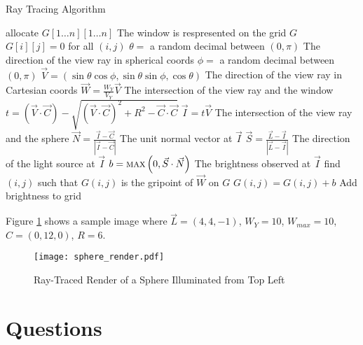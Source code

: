 \documentclass{article}
\begin{document}
\begin{algorithm}
  \caption{Ray Tracing Algorithm}
  \label{Alg}
  \begin{algorithmic}[1]
    \State allocate $G[1\ldots n][1\ldots n]$
      \Comment The window is respresented on the grid $G$
    \State $G[i][j] = 0$ for all $(i,j)$
    \Repeat
      \State $\theta = $ a random decimal between $\left(0, \pi\right)$
        \Comment The direction of the view ray in spherical coords
      \State $\phi = $ a random decimal between $\left(0, \pi\right)$
      \State $\vec V = \left( \sin \theta \cos \phi, \sin \theta \sin \phi, \cos \theta \right)$
        \Comment The direction of the view ray in Cartesian coords
      \State $ \vec W = \frac{W_Y}{V_Y} \vec V $
        \Comment The intersection of the view ray and the window
    \State $ t = \left(\vec V \cdot \vec C \right) - \sqrt{\left(\vec V \cdot \vec C \right)^2 + R^2 - \vec C \cdot \vec C} $
    \State $\vec I = t \vec V$
      \Comment The intersection of the view ray and the sphere
    \State $ \vec N = \frac{\vec I - \vec C}{\left| \vec I - \vec C \right|} $
      \Comment The unit normal vector at $\vec I$
    \State $\vec S = \frac{\vec L - \vec I}{\left| \vec L - \vec I \right|} $
      \Comment The direction of the light source at $\vec I$
    \State $b = \textsc{max}\left( 0, \vec S \cdot \vec N \right)$
      \Comment The brightness observed at $\vec I$
    \State find $\left(i,j\right)$ such that $G(i,j)$ is the gripoint of $\vec W$ on $G$
    \State $G\left(i,j\right) = G\left(i,j\right) + b$
      \Comment Add brightness to grid
    \EndFor
  \end{algorithmic}
\end{algorithm}

Figure \ref{FigResults} shows a sample image where $\vec L =
(4,4,-1)$, $W_Y = 10$, $W_{max} = 10$, $C = (0,12,0)$, $R = 6$.


\begin{figure}[hb]
  \label{FigResults}
  \centering
  \texttt{[image: sphere\_render.pdf]}
  \caption{Ray-Traced Render of a Sphere Illuminated from Top Left}
\end{figure}

\newpage

\section{Questions}
\end{document}
